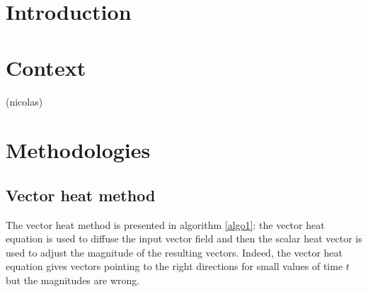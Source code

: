 \documentclass[sigconf]{acmart}
\begin{document}



\maketitle

\section{Introduction}

\section{Context}
(nicolas)

\section{Methodologies}
\subsection{Vector heat method}
The vector heat method is presented in algorithm \ref{algo1}: the vector heat equation is used to diffuse the input vector field and then the scalar heat vector is used to adjust the magnitude of the resulting vectors. Indeed, the vector heat equation gives vectors pointing to the right directions for small values of time $t$ but the magnitudes are wrong. 
\end{document}
